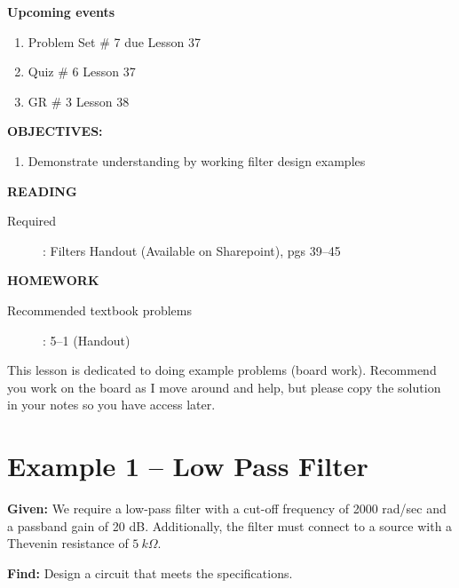 \documentclass{handout}
\begin{document}
\maketitle

\textbf{Upcoming events}
\begin{enumerate}
\item Problem Set \# 7 due Lesson 37
\item Quiz \# 6 Lesson 37
\item GR \# 3 Lesson 38
\end{enumerate}

\textbf{OBJECTIVES:}
\begin{enumerate}
\item Demonstrate understanding by working filter design examples
\end{enumerate}

\textbf{READING}
\begin{description}
\item [Required]:
Filters Handout (Available on Sharepoint), pgs 39--45
\end{description}

\textbf{HOMEWORK}
\begin{description}
\item [Recommended textbook problems]: 5--1 (Handout)
\end{description}

This lesson is dedicated to doing example problems (board work).  Recommend you work on the board as I move around and help, but please copy the solution in your notes so you have access later.

\section{Example 1 -- Low Pass Filter}
\textbf{Given:}  We require a low-pass filter with a cut-off frequency of 2000 rad/sec and a passband gain of 20 dB.  Additionally, the filter must connect to a source with a Thevenin resistance of $5 \ k\Omega$.

\noindent \textbf{Find:}  Design a circuit that meets the specifications.

\end{document}
